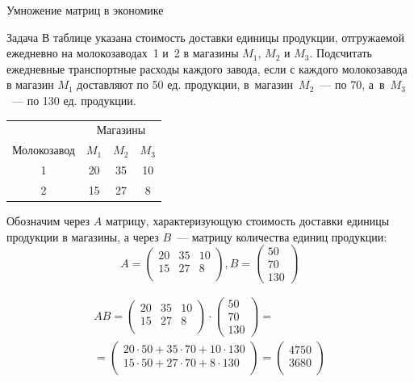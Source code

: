 \documentclass[unicode,11pt,notheorems]{beamer}
\begin{document}
\begin{frame}[allowframebreaks]{Умножение матриц в экономике}{}
\begin{exampleblock}{Задача}
В таблице указана стоимость доставки единицы продукции, отгружаемой ежедневно на молокозаводах~1 и~2 в магазины $M_1$, $M_2$ и $M_3$. Подсчитать ежедневные транспортные расходы каждого завода, если  с каждого молокозавода в магазин $M_1$ доставляют по 50 ед. продукции, в~магазин~$M_2$~--- по 70, а~в~$M_3$~--- по 130 ед. продукции.

{\centering
\begin{tabular}{cccc}
\hline
& \multicolumn{3}{c}{Магазины}\\
Молокозавод & $M_1$ & $M_2$ & $M_3$\\
\hline
1 & 20 & 35 & 10\\
2 & 15 & 27 & 8\\
\hline
\end{tabular}
\par
}
\end{exampleblock}

Обозначим через $A$ матрицу, характеризующую стоимость доставки
единицы продукции в магазины,  а через $B$~--- матрицу количества единиц продукции:
$$
A = \begin{pmatrix}
20 & 35 & 10 \\ 15 & 27 & 8\\
\end{pmatrix},
B = \begin{pmatrix}
50 \\ 70 \\ 130
\end{pmatrix}
$$

\begin{multline*}
AB  = \begin{pmatrix}
20 & 35 & 10 \\ 15 & 27 & 8\\
\end{pmatrix}\cdot \begin{pmatrix}
50 \\ 70 \\ 130
\end{pmatrix}
=\\
=
\begin{pmatrix}
20 \cdot 50 + 35 \cdot 70 + 10\cdot 130 \\ 15\cdot 50 + 27\cdot 70 + 8\cdot 130\\
\end{pmatrix}
=
\begin{pmatrix}
4750 \\3680\\
\end{pmatrix}
\end{multline*}


\end{frame}
\end{document}
